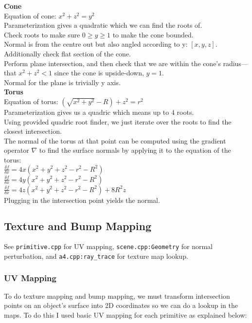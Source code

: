 \documentclass {article}
\begin{document}
\textbf{Cone}\\
Equation of cone: $x^2 + z^2 = y^2$\\
Parameterization gives a quadratic which we can find the roots of.\\
Check roots to make sure $0 \ge y \ge 1$ to make the cone bounded.\\
Normal is from the centre out but also angled according to y: $[x, y, z]$.\\
Additionally check flat section of the cone.\\
Perform plane intersection, and then check that we are within the cone's
radius---that $x^2 + z^2 < 1$ since the cone is upside-down, $y=1$.\\
Normal for the plane is trivially y axis.\\

\textbf{Torus}\\
Equation of torus: $(\sqrt{x^2 + y^2} - R) + z^2 = r^2$\\
Parameterization gives us a quadric which means up to 4 roots.\\
Using provided quadric root finder, we just iterate over the roots to
find the closest intersection.\\
The normal of the torus at that point can be computed using the gradient
operator $\nabla$ to find the surface normals by applying it to the equation of
the torus:\\
$\frac{\delta f}{\delta x} = 4x(x^2 + y^2 + z^2 - r^2 - R^2)$\\
$\frac{\delta f}{\delta x} = 4y(x^2 + y^2 + z^2 - r^2 - R^2)$\\
$\frac{\delta f}{\delta x} = 4z(x^2 + y^2 + z^2 - r^2 - R^2) + 8R^2z$\\
Plugging in the intersection point yields the normal.\\

\subsection{Texture and Bump Mapping}
See \verb!primitive.cpp! for UV mapping,  \verb!scene.cpp:Geometry! for normal
perturbation, and \verb!a4.cpp:ray_trace! for texture map lookup.\\

\subsubsection{UV Mapping}
To do texture mapping and bump mapping, we must transform intersection points on
an object's surface into 2D coordinates so we can do a lookup in the maps.  To
do this I used basic UV mapping for each primitive as explained below:
\end{document}

